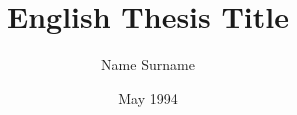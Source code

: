 \documentclass[chaparabic,is,phd,12pt,oneandhalf]{metu}
\author{Name Surname}
\title{English Thesis Title}
\date{May 1994}
\begin{document}
\begin{preliminaries}


\end{preliminaries}
%   
% 
%

\setlength{\parindent}{0em}
\setlength{\parskip}{10pt}








%
%

%

% 
\end{document}
